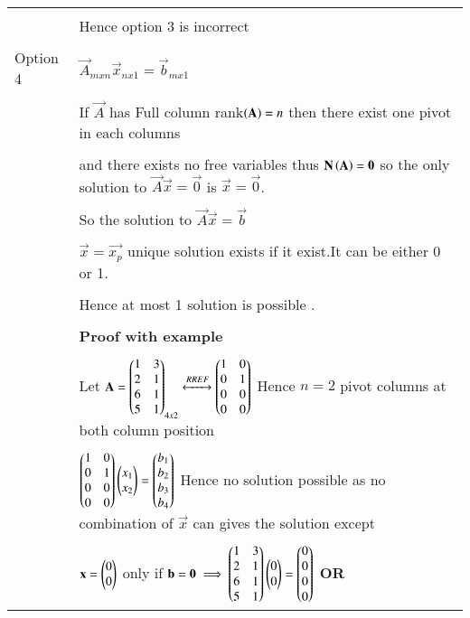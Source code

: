 \documentclass[journal,12pt]{IEEEtran}
\begin{document}
\begin{longtable}{|l|l|}
&\\
&Hence option 3 is incorrect\\
\hline
&\\
Option 4
&$\vec{A}_{mxn}\vec{x}_{nx1}=\vec{b}_{mx1}$\\
&\\
&If $\vec{A}$ has Full column rank$\left(\mathbf{A}\right)=n$ then there exist one pivot in each columns \\
&\\
&and there exists no free variables thus $\mathbf{N\left(A\right)}=\mathbf{0}$ so the only solution to $\vec{A}\vec{x}=\vec{0}$ is $\vec{x}=\vec{0}$.\\ 
&\\
&So the solution to $\vec{A}\vec{x}=\vec{b}$\\
&\\
&$\vec{x}=\vec{x_p}$ unique solution exists if it exist.It can be either 0 or 1.\\
&\\
&Hence at most 1 solution is possible .\\
&\\
&\textbf{Proof with example}\\
&\\
&Let $\mathbf{A}=\begin{pmatrix}1&3\\2&1\\6&1\\5&1\end{pmatrix}_{4x2}\xleftrightarrow{RREF}\begin{pmatrix}1&0\\0&1\\0&0\\0&0\end{pmatrix}$ Hence $n=2$ pivot columns at both column position \\ 
&\\
&$\begin{pmatrix}1&0\\0&1\\0&0\\0&0\end{pmatrix}\begin{pmatrix}x_1\\x_2\end{pmatrix}=\begin{pmatrix}b_1\\b_2\\b_3\\b_4\end{pmatrix}$ Hence no solution possible  as no combination of $\vec{x}$ can gives the solution except\\
&\\
&$\mathbf{x}=\begin{pmatrix}0\\0\end{pmatrix}$ only if $\mathbf{b}=\mathbf{0} \implies \begin{pmatrix}1&3\\2&1\\6&1\\5&1\end{pmatrix}\begin{pmatrix}0\\0\end{pmatrix}=\begin{pmatrix}0\\0\\0\\0\end{pmatrix}$ \textbf{OR}\\

\end{longtable}
\end{document}
